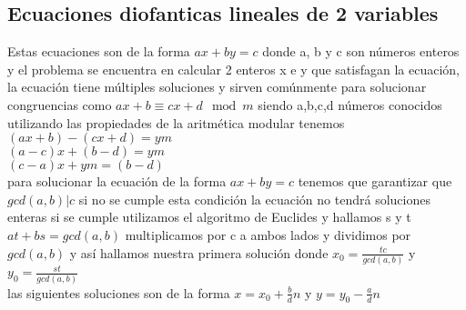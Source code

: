 \subsection{Ecuaciones diofanticas lineales de 2 variables }
Estas ecuaciones son de la forma $ax+by=c$ donde a, b y c son números enteros y el problema se encuentra en calcular
2 enteros x e y que satisfagan la ecuación, la ecuación tiene múltiples soluciones y sirven comúnmente para solucionar congruencias como $ax+b\equiv cx+d \mod{m}$ siendo a,b,c,d números conocidos utilizando las propiedades de la aritmética modular tenemos\\
$(ax+b)-(cx+d)=ym$\\
$(a-c)x+(b-d)=ym$\\
$(c-a)x+ym=(b-d)$\\
para solucionar la ecuación de la forma $ax+by=c$  tenemos que garantizar que $gcd(a,b)|c$
si no se cumple esta condición la ecuación no tendrá soluciones enteras
si  se cumple utilizamos el algoritmo de Euclides  y hallamos s y t $at+bs=gcd(a,b)$
multiplicamos por c a ambos lados y dividimos por $gcd(a,b)$ y así hallamos nuestra primera solución
donde $x_{0}=\frac{tc}{gcd(a,b)}$ y $y_{0}=\frac{st}{gcd(a,b)}$ \\
las siguientes soluciones son de la forma $x = x_{0} + \frac{b}{d}n$ y $y = y_{0} - \frac{a}{d}n$
